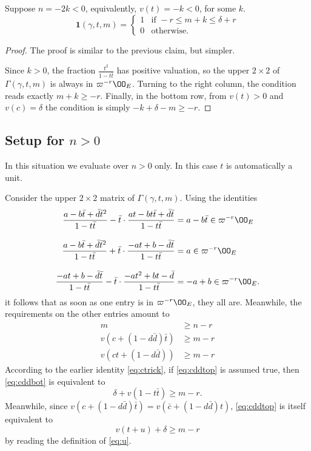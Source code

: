 \begin{claim}
  Suppose $n = -2k < 0$, equivalently, $v(t) = -k < 0$, for some $k$.
  \[
    \mathbf{1}(\gamma, t, m) =
    \begin{cases}
      1 & \text{if } -r \le m+k \le \delta+r \\
      0 & \text{otherwise.}
    \end{cases}
  \]
\end{claim}
\begin{proof}
  The proof is similar to the previous claim, but simpler.

  Since $k > 0$, the fraction $\frac{t^2}{1-t \bar t}$ has positive valuation,
  so the upper $2 \times 2$ of $\Gamma(\gamma, t, m)$ is always in $\varpi^{-r}\OO_E$.
  Turning to the right column, the condition reads exactly $m+k \geq -r$.
  Finally, in the bottom row, from $v(t) > 0$ and $v(c) = \delta$
  the condition is simply $-k+\delta-m \geq -r$.
\end{proof}


\subsection{Setup for $n > 0$}
In this situation we evaluate over $n > 0$ only.
In this case $t$ is automatically a unit.

Consider the upper $2 \times 2$ matrix of $\Gamma(\gamma, t, m)$.
Using the identities
\begin{align*}
  \dfrac{a-b\bar t+\bar d \bar t^2}{1-t \bar t}
    - \bar t \cdot \dfrac{at-bt\bar t+\bar d \bar t}{1-t \bar t}
    &= a-b\bar t \in \varpi^{-r} \OO_E \\[2ex]
  \dfrac{a-b\bar t+\bar d \bar t^2}{1-t \bar t}
    + \bar t \cdot \dfrac{-at+b-\bar d \bar t}{1-t \bar t}
    &= a \in \varpi^{-r} \OO_E \\[2ex]
  \dfrac{-at+b-\bar d \bar t}{1-t \bar t}
    - \bar t \cdot \dfrac{-at^2+bt-\bar d}{1-t \bar t}
    &= -a+b \in \varpi^{-r} \OO_E.
\end{align*}
it follows that as soon as one entry is in $\varpi^{-r} \OO_E$, they all are.
Meanwhile, the requirements on the other entries amount to
\begin{align}
  m & \geq n - r \\
  v\left( c+(1-d \bar d) \bar t \right) &\geq m-r \label{eq:cddtop} \\
  v\left( ct+(1-d \bar d) \right) &\geq m-r \label{eq:cddbot}
\end{align}
According to the earlier identity \eqref{eq:ctrick},
if \eqref{eq:cddtop} is assumed true,
then \eqref{eq:cddbot} is equivalent to
\[ \delta + v(1-t \bar t) \ge m-r. \]
Meanwhile, since $v(c+(1-d \bar d) \bar t) = v(\bar c + (1-d \bar d)t)$,
\eqref{eq:cddtop} is itself equivalent to
\[ v(t+u) + \delta \geq m-r \]
by reading the definition of \eqref{eq:u}.

